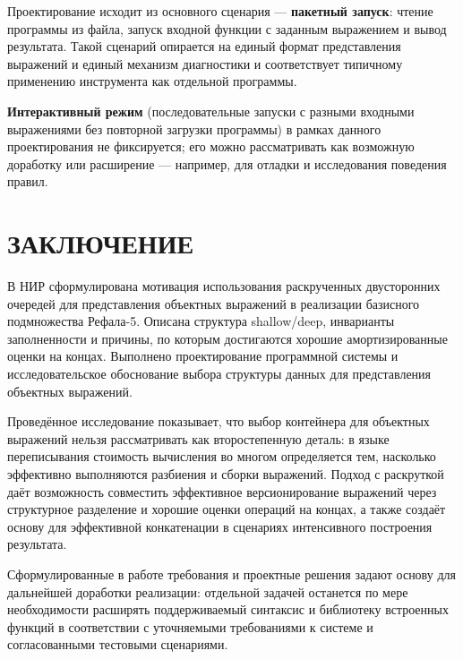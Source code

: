 \documentclass[14pt, russian]{scrartcl}
\newcommand{\anonsection}[1]{\cleardoublepage
\phantomsection
\addcontentsline{toc}{section}{\protect\numberline{}#1}
\section*{#1}\vspace*{2.5ex}}
\begin{document}
Проектирование исходит из основного сценария --- \textbf{пакетный запуск}: чтение программы из файла, запуск входной функции
с заданным выражением и вывод результата. Такой сценарий опирается на единый формат представления выражений и единый механизм диагностики
и соответствует типичному применению инструмента как отдельной программы.

\textbf{Интерактивный режим} (последовательные запуски с разными входными выражениями без повторной загрузки программы) в рамках
данного проектирования не фиксируется; его можно рассматривать как возможную доработку или расширение --- например, для отладки
и исследования поведения правил.

\anonsection{ЗАКЛЮЧЕНИЕ}

В НИР сформулирована мотивация использования раскрученных двусторонних очередей для представления
объектных выражений в реализации базисного подмножества Рефала-5. Описана структура shallow/deep,
инварианты заполненности и причины, по которым достигаются хорошие амортизированные оценки на концах.
Выполнено проектирование программной системы и исследовательское обоснование выбора структуры данных
для представления объектных выражений.

Проведённое исследование показывает, что выбор контейнера для объектных выражений нельзя рассматривать как второстепенную деталь:
в языке переписывания стоимость вычисления во многом определяется тем, насколько эффективно выполняются разбиения и сборки выражений.
Подход с раскруткой даёт возможность совместить эффективное версионирование выражений через структурное разделение и хорошие оценки операций на концах,
а также создаёт основу для эффективной конкатенации в сценариях интенсивного построения результата.

Сформулированные в работе требования и проектные решения задают основу для дальнейшей доработки реализации: отдельной задачей
останется по мере необходимости расширять поддерживаемый синтаксис и библиотеку встроенных функций в соответствии
с уточняемыми требованиями к системе и согласованными тестовыми сценариями.

\clearpage
\printbibliography[heading=bibintoc,title={СПИСОК ИСПОЛЬЗОВАННЫХ ИСТОЧНИКОВ}]
\end{document}
